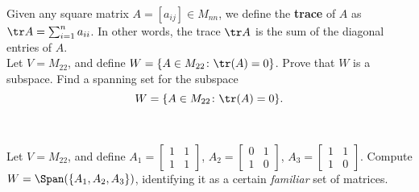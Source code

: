 \bb
\ii \label{ex:trace} Given any square matrix $A=[a_{ij}]\in M_{nn}$, we define the {\bf trace} of $A$ as $\tr A=\sum_{i=1}^n a_{ii}$. In other words, the trace $\tr A$ is the sum of the diagonal entries of $A$. 
\\
Let $V=M_{22}$, and define $W=\{A\in M_{22}\colon \tr(A)=0\}$. 
\bb
\ii Prove that $W$ is a subspace. 
\ii Find a spanning set for the subspace 
\[
W=\{A\in M_{22}\colon \tr(A)=0\}.
\]
\ee
\begin{solution}
\ \\
\end{solution}
\ii Let $V=M_{22}$, and define $A_1=\begin{bmatrix}
1&1\\1&1
\end{bmatrix}$, $A_2=\begin{bmatrix}
0&1\\1&0
\end{bmatrix}$, $A_3=\begin{bmatrix}
1&1\\ 1&0
\end{bmatrix}$. 
Compute $W=\Span(\{A_1,A_2,A_3\})$, identifying it as a certain {\em familiar} set of matrices. 
 
